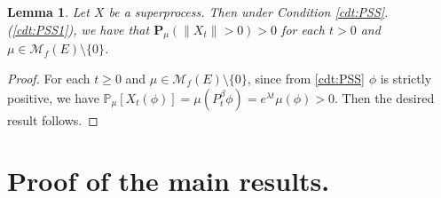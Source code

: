 \documentclass[12pt,a4paper]{amsart}
\numberwithin{equation}{section}
\theoremstyle{plain}
\newtheorem{lem}[thm]{Lemma}
\theoremstyle{definition}
\theoremstyle{remark}
\begin{document}
  \begin{lem}
    \label{lem:PSN}
    Let $X$ be a superprocess. 
    Then under Condition \ref{cdt:PSS}.(\ref{cdt:PSS1}), we have that $\mathbf P_\mu(\|X_t\| > 0) > 0$ for each $t > 0$ and $\mu \in \mathcal M_f(E)\setminus \{0\}$.
  \end{lem}
  
  \begin{proof}
    For each $t\geq 0$ and $\mu \in \mathcal M_f(E)\setminus \{0\}$, since from \ref{cdt:PSS} $\phi$ is strictly positive, we have $\mathbb P_\mu[X_t(\phi)] = \mu(P_t^\beta \phi) = e^{\lambda t} \mu(\phi) > 0$. 
    Then the desired result follows.  
  \end{proof}

\section{Proof of the main results.}
\end{document}
